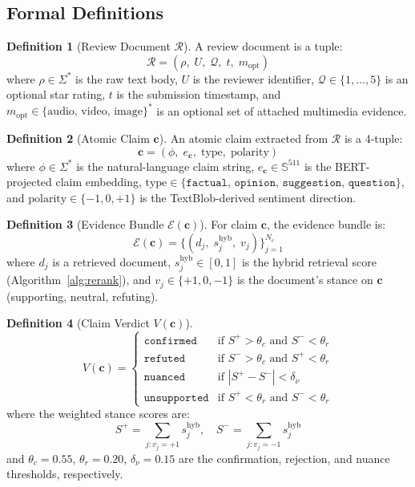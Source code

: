 \documentclass[12pt,a4paper]{article}
\theoremstyle{definition}
\newtheorem{definition}{Definition}[section]
\theoremstyle{plain}
\theoremstyle{remark}
\newcommand{\Sph}{\mathbb{S}}
\begin{document}
\subsection{Formal Definitions}
\label{sec:arrs_defs}

\begin{definition}[Review Document $\mathcal{R}$]
A review document is a tuple:
\[
  \mathcal{R} = (\rho,\; U,\; \mathcal{Q},\; t,\; m_{\text{opt}})
\]
where $\rho \in \Sigma^*$ is the raw text body, $U$ is the reviewer identifier, 
$\mathcal{Q} \in \{1,\ldots,5\}$ is an optional star rating, $t$ is the 
submission timestamp, and $m_{\text{opt}} \in \{\text{audio, video, image}\}^*$ 
is an optional set of attached multimedia evidence.
\end{definition}

\begin{definition}[Atomic Claim $\mathbf{c}$]
An atomic claim extracted from $\mathcal{R}$ is a 4-tuple:
\[
  \mathbf{c} = (\phi,\; e_{\mathbf{c}},\; \text{type},\; \text{polarity})
\]
where $\phi \in \Sigma^*$ is the natural-language claim string, 
$e_{\mathbf{c}} \in \Sph^{511}$ is the BERT-projected claim embedding, 
$\text{type} \in \{\mathtt{factual},\, \mathtt{opinion},\, \mathtt{suggestion},\, 
\mathtt{question}\}$, and $\text{polarity} \in \{-1, 0, +1\}$ is the 
TextBlob-derived sentiment direction.
\end{definition}

\begin{definition}[Evidence Bundle $\mathcal{E}(\mathbf{c})$]
For claim $\mathbf{c}$, the evidence bundle is:
\[
  \mathcal{E}(\mathbf{c}) = \bigl\{(d_j,\; s_j^{\text{hyb}},\; v_j)\bigr\}_{j=1}^{N_e}
\]
where $d_j$ is a retrieved document, $s_j^{\text{hyb}} \in [0,1]$ is the 
hybrid retrieval score (Algorithm~\ref{alg:rerank}), and 
$v_j \in \{+1, 0, -1\}$ is the document's stance on $\mathbf{c}$ 
(supporting, neutral, refuting).
\end{definition}

\begin{definition}[Claim Verdict $V(\mathbf{c})$]
\[
  V(\mathbf{c}) = 
  \begin{cases}
    \mathtt{confirmed}   & \text{if } S^+ > \theta_c \text{ and } S^- < \theta_r \\
    \mathtt{refuted}     & \text{if } S^- > \theta_c \text{ and } S^+ < \theta_r \\
    \mathtt{nuanced}     & \text{if } |S^+ - S^-| < \delta_\nu \\
    \mathtt{unsupported} & \text{if } S^+ < \theta_r \text{ and } S^- < \theta_r
  \end{cases}
\]
where the weighted stance scores are:
\[
  S^+ = \sum_{j : v_j = +1} s_j^{\text{hyb}}, \quad
  S^- = \sum_{j : v_j = -1} s_j^{\text{hyb}}
\]
and $\theta_c = 0.55$, $\theta_r = 0.20$, $\delta_\nu = 0.15$ are the confirmation, 
rejection, and nuance thresholds, respectively.
\end{definition}
\end{document}

